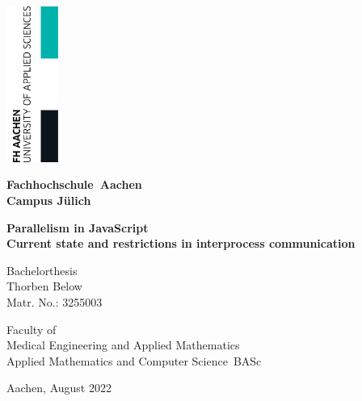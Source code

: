 \begin{titlepage}

	\thispagestyle{empty}

	\begin{flushright}
		\includegraphics[width=1.7cm]{./assets/FHAC.jpg}
	\end{flushright}
	\vspace{-2.5cm}

	\centering \bfseries \Large Fachhochschule~Aachen \\Campus Jülich
	\vspace{2.5cm}
	\normalsize

	\centering \begin{minipage}[t]{17cm}
		\centering \bfseries \large Parallelism in JavaScript \\Current state and restrictions in interprocess communication
		\medskip
	\end{minipage}

	\vspace{2.5cm}

	\begin{minipage}[t]{9cm}
		\centering Bachelorthesis \\
		\centering Thorben Below \\ Matr. No.: 3255003
	\end{minipage}

	\vspace{3cm}
	\normalsize Faculty of\\
	Medical Engineering and Applied Mathematics \\
	Applied Mathematics and Computer Science~BASc
	\vspace{2.1cm}

	\vspace{2cm}
	\centering %
	\begin{minipage}[b]{7cm}
		\centering
		Aachen, August 2022\\
	\end{minipage}

	\restoregeometry

\end{titlepage}
